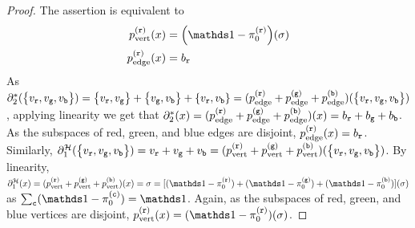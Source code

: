 \documentclass[a4paper,twocolumn,11pt,accepted=2025-01-21]{quantumarticle}
\theoremstyle{definition}
\theoremstyle{definition}
\theoremstyle{definition}
\begin{document}
\begin{proof}
    The assertion is equivalent to
    \begin{align*}
        p_\mr{vert}^{(\rbs)} (x) &= \qty(\identity - \pi_0^{(\rbs)})(\sigma) \\
        p_\mr{edge}^{(\rbs)} (x) &= b_\rbs
    \end{align*}
    As $\partial_2^*(\qty{v_{\texttt{r}},v_{\texttt{g}},v_{\texttt{b}}}) = \qty{v_{\texttt{r}},v_{\texttt{g}}}+\qty{v_{\texttt{g}},v_{\texttt{b}}}+\qty{v_{\texttt{r}},v_{\texttt{b}}} = (p_{\mathrm{edge}}^{(\texttt{r})} + p_{\mathrm{edge}}^{(\texttt{g})} + p_{\mathrm{edge}}^{(\texttt{b})})(\qty{v_{\texttt{r}},v_{\texttt{g}},v_{\texttt{b}}})$, applying linearity we get that $\partial_2^* (x) = (p_{\mathrm{edge}}^{(\texttt{r})} + p_{\mathrm{edge}}^{(\texttt{g})} + p_{\mathrm{edge}}^{(\texttt{b})})(x) = b_{\texttt{r}} + b_{\texttt{g}} + b_{\texttt{b}}$. As the subspaces of red, green, and blue edges are disjoint, $p_{\mathrm{edge}}^{(\texttt{r})}(x) = b_{\texttt{r}}$. 
    Similarly, $\partial_1^\mathcal{H}(\qty{v_{\texttt{r}},v_{\texttt{g}},v_{\texttt{b}}}) = v_{\texttt{r}} + v_{\texttt{g}} + v_{\texttt{b}} = (p_{\mathrm{vert}}^{(\texttt{r})} + p_{\mathrm{vert}}^{(\texttt{g})} + p_{\mathrm{vert}}^{(\texttt{b})})(\qty{v_{\texttt{r}},v_{\texttt{g}},v_{\texttt{b}}})$. 
    By linearity, $\partial_1^\mathcal{H}(x) = (p_\mr{vert}^{(\rbs)} + p_\mr{vert}^{(\gbs)} + p_\mr{vert}^{(\bbs)})(x) = \sigma = [(\identity - \pi_0^{(\rbs)}) + (\identity - \pi_0^{(\gbs)}) + (\identity - \pi_0^{(\bbs)})](\sigma)$ as $\sum_\cbs (\identity - \pi_0^{(\cbs)}) = \identity$. 
    Again, as the subspaces of red, green, and blue vertices are disjoint, $p_\mr{vert}^{(\rbs)}(x) = (\identity - \pi_0^{(\rbs)})(\sigma)$.
\end{proof}


\end{document}
